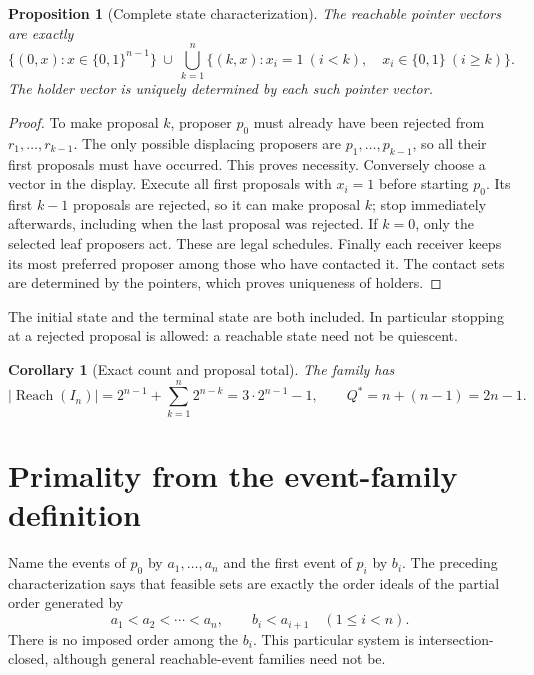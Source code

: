 \documentclass[11pt]{article}
\newtheorem{proposition}{Proposition}
\newtheorem{corollary}{Corollary}
\begin{document}
\begin{proposition}[Complete state characterization]
The reachable pointer vectors are exactly
\[
 \{(0,x):x\in\{0,1\}^{n-1}\}\ \cup\
 \bigcup_{k=1}^{n}\{(k,x):x_i=1\ (i<k),\quad
                   x_i\in\{0,1\}\ (i\geq k)\}.
\]
The holder vector is uniquely determined by each such pointer vector.
\end{proposition}
\begin{proof}
To make proposal $k$, proposer $p_0$ must already have been rejected from $r_1,\ldots,r_{k-1}$. The only possible displacing proposers are $p_1,\ldots,p_{k-1}$, so all their first proposals must have occurred. This proves necessity. Conversely choose a vector in the display. Execute all first proposals with $x_i=1$ before starting $p_0$. Its first $k-1$ proposals are rejected, so it can make proposal $k$; stop immediately afterwards, including when the last proposal was rejected. If $k=0$, only the selected leaf proposers act. These are legal schedules. Finally each receiver keeps its most preferred proposer among those who have contacted it. The contact sets are determined by the pointers, which proves uniqueness of holders.
\end{proof}
The initial state and the terminal state are both included. In particular stopping at a rejected proposal is allowed: a reachable state need not be quiescent.

\begin{corollary}[Exact count and proposal total]
The family has
\[
 |\operatorname{Reach}(I_n)|=2^{n-1}+\sum_{k=1}^{n}2^{n-k}
 =3\cdot2^{n-1}-1,
 \qquad Q^*=n+(n-1)=2n-1.
\]
\end{corollary}

\section*{Primality from the event-family definition}
Name the events of $p_0$ by $a_1,\ldots,a_n$ and the first event of $p_i$ by $b_i$. The preceding characterization says that feasible sets are exactly the order ideals of the partial order generated by
\[
 a_1<a_2<\cdots<a_n,\qquad b_i<a_{i+1}\quad(1\leq i<n).
\]
There is no imposed order among the $b_i$. This particular system is intersection-closed, although general reachable-event families need not be.
\end{document}
